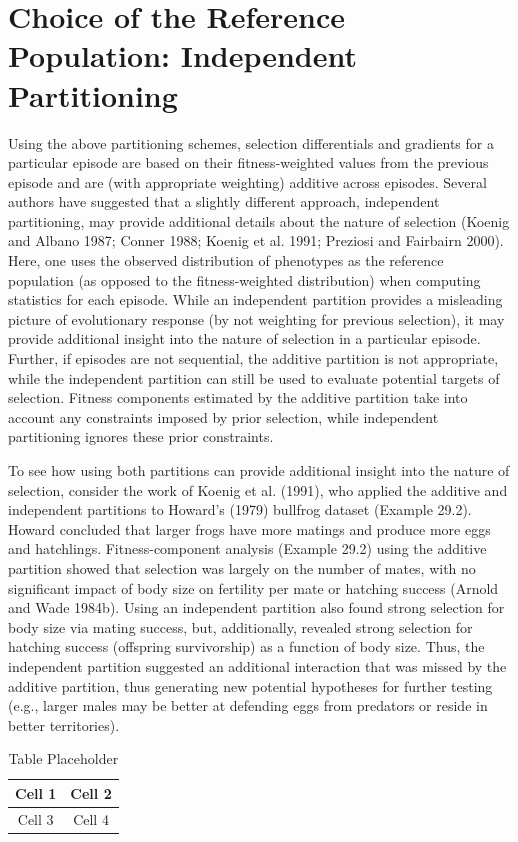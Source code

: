\documentclass{article}
\begin{document}
\section{Choice of the Reference Population: Independent Partitioning}
Using the above partitioning schemes, selection differentials and gradients for a particular episode are based on their fitness-weighted values from the previous episode and are (with appropriate weighting) additive across episodes. Several authors have suggested that a slightly different approach, independent partitioning, may provide additional details about the nature of selection (Koenig and Albano 1987; Conner 1988; Koenig et al. 1991; Preziosi and Fairbairn 2000). Here, one uses the observed distribution of phenotypes as the reference population (as opposed to the fitness-weighted distribution) when computing statistics for each episode. While an independent partition provides a misleading picture of evolutionary response (by not weighting for previous selection), it may provide additional insight into the nature of selection in a particular episode. Further, if episodes are not sequential, the additive partition is not appropriate, while the independent partition can still be used to evaluate potential targets of selection. Fitness components estimated by the additive partition take into account any constraints imposed by prior selection, while independent partitioning ignores these prior constraints.

To see how using both partitions can provide additional insight into the nature of selection, consider the work of Koenig et al. (1991), who applied the additive and independent partitions to Howard's (1979) bullfrog dataset (Example 29.2). Howard concluded that larger frogs have more matings and produce more eggs and hatchlings. Fitness-component analysis (Example 29.2) using the additive partition showed that selection was largely on the number of mates, with no significant impact of body size on fertility per mate or hatching success (Arnold and Wade 1984b). Using an independent partition also found strong selection for body size via mating success, but, additionally, revealed strong selection for hatching success (offspring survivorship) as a function of body size. Thus, the independent partition suggested an additional interaction that was missed by the additive partition, thus generating new potential hypotheses for further testing (e.g., larger males may be better at defending eggs from predators or reside in better territories).

\begin{table}[h]
\centering
\begin{tabular}{|c|c|}
\hline
Cell 1 & Cell 2 \\
\hline
Cell 3 & Cell 4 \\
\hline
\end{tabular}
\caption{Table Placeholder}
\end{table}
\end{document}
